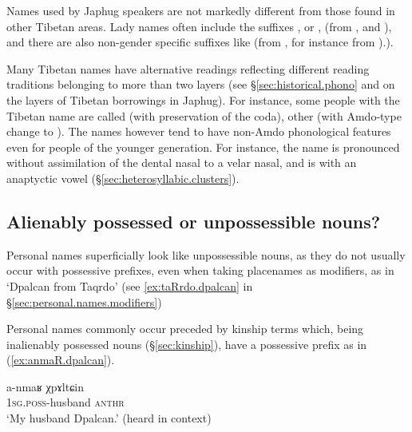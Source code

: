 Names used by Japhug speakers are not markedly different from those found in other Tibetan areas. Lady names often include the suffixes ,  or , (from ,  and ), and there are also non-gender specific suffixes like  (from , for instance  from ).). 

Many Tibetan names have alternative readings reflecting different reading traditions belonging to more than two layers (see §\ref{sec:historical.phono} and \citealt[83--200]{jacques04these} on the layers of Tibetan borrowings in Japhug). For instance, some people with the Tibetan name  are called  (with preservation of the coda), other  (with Amdo-type change to ). The names however tend to have non-Amdo phonological features even for people of the younger generation. For instance, the name  is pronounced  without assimilation of the dental nasal to a velar nasal, and   is  with an anaptyctic vowel (§\ref{sec:heterosyllabic.clusters}).  


 

\subsection{Alienably possessed or unpossessible nouns?} \label{sec:personal.name.APN}
Personal names superficially look like unpossessible nouns, as they do not usually occur with possessive prefixes, even when taking placenames as modifiers, as in  `Dpalcan from Taqrdo' (see \ref{ex:taRrdo.dpalcan} in §\ref{sec:personal.names.modifiers})

Personal names commonly occur preceded by kinship terms which, being inalienably possessed nouns (§\ref{sec:kinship}), have a possessive prefix as in (\ref{ex:anmaR.dpalcan}). 

\begin{exe}
\ex \label{ex:anmaR.dpalcan}
\gll a-nmaʁ χpɤltɕin \\
\textsc{1sg}.\textsc{poss}-husband  \textsc{anthr} \\
\glt `My husband Dpalcan.' (heard in context)
\end{exe}

